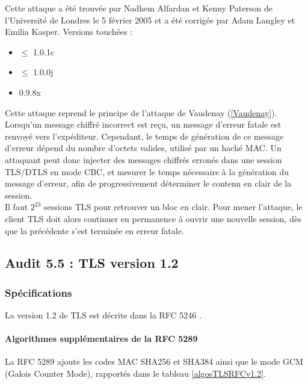 
Cette attaque \cite{CVE20130169} a été trouvée par Nadhem Alfardan et Kenny Paterson de l'Université de Londres le 5 février 2005 et a été corrigée par Adam Langley et Emilia Kasper. Versions touchées :
\begin{itemize}
\item $\le$ 1.0.1c 
\item $\le$ 1.0.0j 
\item 0.9.8x
\end{itemize}

Cette attaque reprend le principe de l'attaque de Vaudenay (\ref{Vaudenay}).\\

 
Lorsqu'un message chiffré incorrect est reçu, un message d'erreur fatale est renvoyé vers l'expéditeur. Cependant, le temps de génération de ce message d'erreur dépend du nombre d'octets valides, utilisé par un haché MAC. Un attaquant peut donc injecter des messages chiffrés erronés dans une session TLS/DTLS en mode CBC, et mesurer le temps nécessaire à la génération du message d'erreur, afin de progressivement déterminer le contenu en clair de la session.\\


Il faut $2^{23}$ sessions TLS pour retrouver un bloc en clair. Pour mener l'attaque, le client TLS doit alors continuer en permanence à ouvrir une nouvelle session, dès que la précédente s'est terminée en erreur fatale.



\subsection{Audit 5.5 : TLS version 1.2}
\subsubsection{Spécifications}

La version 1.2 de TLS est décrite dans la RFC 5246 \cite{rfc5246}.

\paragraph{Algorithmes supplémentaires de la RFC 5289} 
La RFC 5289 \cite{rfc5289} ajoute les codes MAC SHA256 et SHA384 ainsi que le mode GCM (Galois Counter Mode), rapportés dans le tableau \ref{algosTLSRFCv1.2}.

